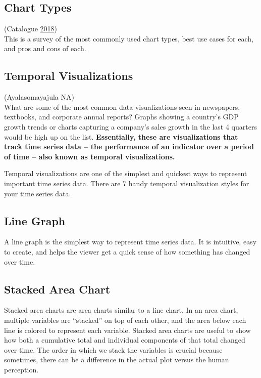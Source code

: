\documentclass[]{book}
\theoremstyle{definition}
\theoremstyle{definition}
\theoremstyle{definition}
\theoremstyle{remark}
\begin{document}
\subsection{Chart Types}\label{chart-types}

(Catalogue \protect\hyperlink{ref-charts_viz}{2018})\\
This is a survey of the most commonly used chart types, best use cases
for each, and pros and cons of each.

\subsection{Temporal Visualizations}\label{temporal-visualizations}

(Ayalasomayajula NA)\\
What are some of the most common data visualizations seen in newspapers,
textbooks, and corporate annual reports? Graphs showing a country's GDP
growth trends or charts capturing a company's sales growth in the last 4
quarters would be high up on the list. \textbf{Essentially, these are
visualizations that track time series data -- the performance of an
indicator over a period of time -- also known as temporal
visualizations.}

Temporal visualizations are one of the simplest and quickest ways to
represent important time series data. There are 7 handy temporal
visualization styles for your time series data.

\subsection{Line Graph}\label{line-graph}

A line graph is the simplest way to represent time series data. It is
intuitive, easy to create, and helps the viewer get a quick sense of how
something has changed over time.

\subsection{Stacked Area Chart}\label{stacked-area-chart}

Stacked area charts are area charts similar to a line chart. In an area
chart, multiple variables are ``stacked'' on top of each other, and the
area below each line is colored to represent each variable. Stacked area
charts are useful to show how both a cumulative total and individual
components of that total changed over time. The order in which we stack
the variables is crucial because sometimes, there can be a difference in
the actual plot versus the human perception.
\end{document}
